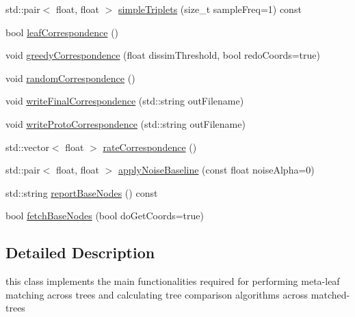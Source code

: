 \begin{DoxyCompactItemize}
\item 
std\-::pair$<$ float, float $>$ \hyperlink{classtreeComparer_aa35e905726e481a1d51103dd5f9815c7}{simple\-Triplets} (size\-\_\-t sample\-Freq=1) const 
\item 
bool \hyperlink{classtreeComparer_ac29c95118034b2cb9a1a7c2a7b438698}{leaf\-Correspondence} ()
\item 
void \hyperlink{classtreeComparer_ae160e4175a3f7d1a9563babe30c4c548}{greedy\-Correspondence} (float dissim\-Threshold, bool redo\-Coords=true)
\item 
void \hyperlink{classtreeComparer_a18327588d6bcf43220beedf4a5fa1e14}{random\-Correspondence} ()
\item 
void \hyperlink{classtreeComparer_a03cafc0fbf56f03ee3feac15422616e1}{write\-Final\-Correspondence} (std\-::string out\-Filename)
\item 
void \hyperlink{classtreeComparer_a1bd3f274b1a069ed66c861fa184c4535}{write\-Proto\-Correspondence} (std\-::string out\-Filename)
\item 
std\-::vector$<$ float $>$ \hyperlink{classtreeComparer_ad627f4fd68587f567c9647ccca37914c}{rate\-Correspondence} ()
\item 
std\-::pair$<$ float, float $>$ \hyperlink{classtreeComparer_a2bacc683c09597ff98d0ce5352053122}{apply\-Noise\-Baseline} (const float noise\-Alpha=0)
\item 
std\-::string \hyperlink{classtreeComparer_aed2990051e67d007d168e1b1c51168f3}{report\-Base\-Nodes} () const 
\item 
bool \hyperlink{classtreeComparer_a5e381783846840c65126a49847e1e560}{fetch\-Base\-Nodes} (bool do\-Get\-Coords=true)
\end{DoxyCompactItemize}


\subsection{\-Detailed \-Description}
this class implements the main functionalities required for performing meta-\/leaf matching across trees and calculating tree comparison algorithms across matched-\/trees 


